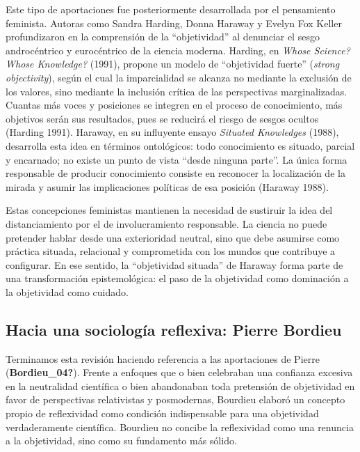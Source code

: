 \documentclass[
  spanish,
  letterpaper,
  DIV=11,
  numbers=noendperiod]{scrreprt}
\begin{document}
Este tipo de aportaciones fue posteriormente desarrollada por el
pensamiento feminista. Autoras como Sandra Harding, Donna Haraway y
Evelyn Fox Keller profundizaron en la comprensión de la ``objetividad''
al denunciar el sesgo androcéntrico y eurocéntrico de la ciencia
moderna. Harding, en \emph{Whose Science? Whose Knowledge?} (1991),
propone un modelo de ``objetividad fuerte'' (\emph{strong objectivity}),
según el cual la imparcialidad se alcanza no mediante la exclusión de
los valores, sino mediante la inclusión crítica de las perspectivas
marginalizadas. Cuantas más voces y posiciones se integren en el proceso
de conocimiento, más objetivos serán sus resultados, pues se reducirá el
riesgo de sesgos ocultos (Harding 1991). Haraway, en su influyente
ensayo \emph{Situated Knowledges} (1988), desarrolla esta idea en
términos ontológicos: todo conocimiento es situado, parcial y encarnado;
no existe un punto de vista ``desde ninguna parte''. La única forma
responsable de producir conocimiento consiste en reconocer la
localización de la mirada y asumir las implicaciones políticas de esa
posición (Haraway 1988).

Estas concepciones feministas mantienen la necesidad de sustiruir la
idea del distanciamiento por el de involucramiento responsable. La
ciencia no puede pretender hablar desde una exterioridad neutral, sino
que debe asumirse como práctica situada, relacional y comprometida con
los mundos que contribuye a configurar. En ese sentido, la ``objetividad
situada'' de Haraway forma parte de una transformación epistemológica:
el paso de la objetividad como dominación a la objetividad como cuidado.

\subsection{Hacia una sociología reflexiva: Pierre
Bordieu}\label{hacia-una-sociologuxeda-reflexiva-pierre-bordieu}

Terminamos esta revisión haciendo referencia a las aportaciones de
Pierre (\textbf{Bordieu\_04?}). Frente a enfoques que o bien celebraban
una confianza excesiva en la neutralidad científica o bien abandonaban
toda pretensión de objetividad en favor de perspectivas relativistas y
posmodernas, Bourdieu elaboró un concepto propio de reflexividad como
condición indispensable para una objetividad verdaderamente científica.
Bourdieu no concibe la reflexividad como una renuncia a la objetividad,
sino como su fundamento más sólido.
\end{document}
